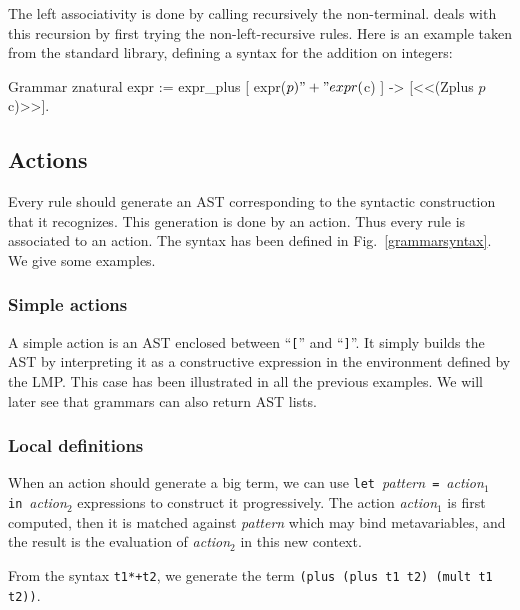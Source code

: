 The left associativity is done by calling recursively the
non-terminal. {\camlpppp} deals with this recursion by first trying
the non-left-recursive rules. Here is an example taken from the
standard library, defining a syntax for the addition on integers:

\begin{coq_example*}
Grammar znatural expr :=
  expr_plus [ expr($p) "+" expr($c) ] -> [<<(Zplus $p $c)>>].
\end{coq_example*}



\subsection{Actions}
\label{GramAction}

Every rule should generate an AST corresponding to the syntactic
construction that it recognizes. This generation is done by an
action. Thus every rule is associated to an action. The syntax has
been defined in Fig.~\ref{grammarsyntax}. We give some examples.

\subsubsection{Simple actions}

A simple action is an AST enclosed between ``\verb+[+'' and
``\verb+]+''. It simply builds the AST by interpreting it as a
constructive expression in the environment defined by the LMP. This
case has been illustrated in all the previous examples.  We will later
see that grammars can also return AST lists.


\subsubsection{Local definitions}

When an action should generate a big term, we can use
\texttt{let}~\textsl{pattern}~\texttt{=}~\textsl{action}$_1$~%
\texttt{in}~\textsl{action}$_2$ expressions to
construct it progressively. The action \textsl{action}$_1$ is first
computed, then it is matched against \textsl{pattern} which may bind
metavariables, and the result is the evaluation of \textsl{action}$_2$
in this new context.

\example{}

\noindent From the syntax \verb|t1*+t2|, we generate the term
{\tt (plus (plus t1 t2) (mult t1 t2))}.

